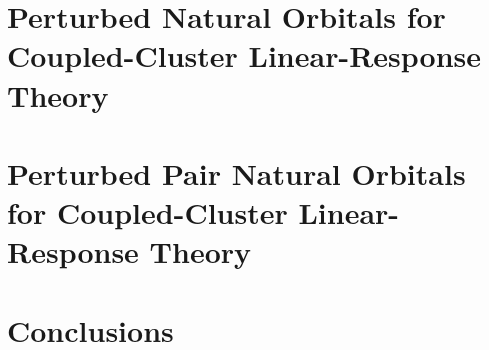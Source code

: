 \documentclass[12pt]{report}
\begin{document}
\chapter{Perturbed Natural Orbitals for Coupled-Cluster Linear-Response Theory}

\chapter{Perturbed Pair Natural Orbitals for Coupled-Cluster Linear-Response Theory}

\chapter{Conclusions}
%
%

%



%


%


\end{document}
